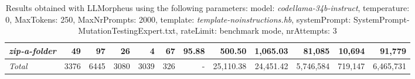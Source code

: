 \begin{table*}
{\begin{tabular}{l||r|r|r|r|r|r||r|r||r|r|r}
   \hline
   \textit{zip-a-folder} & 49 & 97 & 26 & 4 & 67 & 95.88 & 500.50 & 1,065.03 & 81,085 & 10,694 & 91,779 \\ 
   \hline
   \textit{Total} & 3376 & 6445 & 3080 & 3039 & 326 & - & 25,110.38  & 24,451.42 & 5,746,584 & 719,147 & 6,465,731 \\ 
 \end{tabular}
 }
 \caption{Results obtained with LLMorpheus using the following parameters: 
   model: \textit{codellama-34b-instruct}, 
   temperature: 0, 
   MaxTokens: 250, 
   MaxNrPrompts: 2000, 
   template: \textit{template-noinstructions.hb}, 
   systemPrompt: SystemPrompt-MutationTestingExpert.txt, 
   rateLimit: benchmark mode, 
   nrAttempts: 3  
 }
\end{table*}

